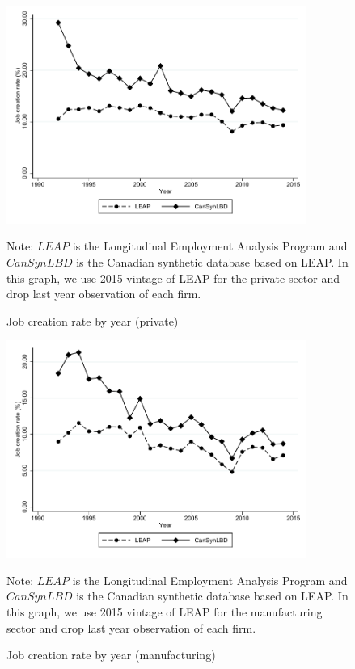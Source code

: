 \documentclass{article}
\begin{document}
\begin{figure} [H]
\centering
\caption{Job creation rate by year (private)} \label{JobCreationPrivate}
\includegraphics[height=2.8in, width=.7\linewidth]{graphs/Job_creation_rate_by_year_private_bw.pdf} 
\begin{minipage}{0.85\textwidth}
{\footnotesize Note: $LEAP$ is the Longitudinal Employment Analysis Program and $CanSynLBD$ is the Canadian synthetic database based on LEAP. In this graph, we use 2015 vintage of LEAP for the private sector and drop last year observation of each firm. \par}
\end{minipage}
\end{figure}
\begin{figure} [H]
\centering
\caption{Job creation rate  by year (manufacturing)} \label{JobCreationManufacturing}
\includegraphics[height=2.8in, width=.7\linewidth]{graphs/Job_creation_rate_by_year_Manufacturing_bw.pdf} 
\begin{minipage}{0.85\textwidth}
{\footnotesize Note: $LEAP$ is the Longitudinal Employment Analysis Program and $CanSynLBD$ is the Canadian synthetic database based on LEAP. In this graph, we use 2015 vintage of LEAP for the manufacturing sector and drop last year observation of each firm. \par}
\end{minipage}
\end{figure}
\end{document}
